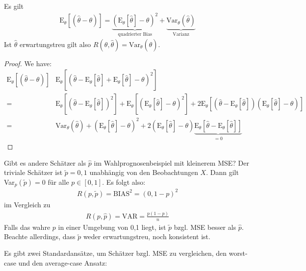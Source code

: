 \documentclass[a4paper]{scrartcl}
\begin{document}
		\begin{theorem}
			Es gilt
			\begin{align*}
				\mathrm{E}_\theta\left[\left(\hat{\theta}-\theta\right)\right]=\underbrace{\left(\mathrm{E}_\theta\left[\hat{\theta}\right]-\theta\right)^2}_{\text{quadrierter Bias}}+\underbrace{\text{Var}_\theta\left(\hat{\theta}\right)}_{\text{Varianz}}
			\end{align*}
			Ist $\hat{\theta}$ erwartungstreu gilt also $R(\theta,\hat{\theta})=\text{Var}_\theta(\hat{\theta})$.
		\end{theorem}
		\begin{proof}
			We have:
			\begin{align*}
				\mathrm{E}_\theta\left[\left(\hat{\theta}-\theta\right)\right]&\mathrm{E}_\theta\left[\left(\hat{\theta}-\mathrm{E}_\theta\left[\hat{\theta}\right]+\mathrm{E}_\theta\left[\hat{\theta}\right]-\theta\right)^2\right]\\
				=&\mathrm{E}_\theta\left[\left(\hat{\theta}-\mathrm{E}_\theta\left[\hat{\theta}\right]\right)^2\right]+\mathrm{E}_\theta\left[\left(\mathrm{E}_\theta\left[\hat{\theta}\right]-\theta\right)^2\right]+2\mathrm{E}_\theta\left[\left(\hat{\theta}-\mathrm{E}_\theta\left[\hat{\theta}\right]\right)\left(\mathrm{E}_\theta\left[\hat{\theta}\right]-\theta\right)\right]\\
				=&\text{Var}_\theta\left(\hat{\theta}\right)+\left(\mathrm{E}_\theta\left[\hat{\theta}\right]-\theta\right)^2+2\left(\mathrm{E}_\theta\left[\hat{\theta}\right]-\theta\right)\underbrace{\mathrm{E}_\theta\left[\hat{\theta}-\mathrm{E}_\theta\left[\hat{\theta}\right]\right]}_{=0}
			\end{align*}
		\end{proof}
		\begin{motivation}
			Gibt es andere Schätzer als $\hat{p}$ im Wahlprognosenbeispiel mit kleinerem MSE? Der triviale Schätzer ist $\tilde{p}=0,1$ unabhängig von den Beobachtungen $X$. Dann gilt Var$_p(\tilde{p})=0$ für alle $p\in[0,1]$. Es folgt also:
			\begin{align*}
				R(p,\tilde{p})=\text{BIAS}^2=(0,1-p)^2
			\end{align*}
			im Vergleich zu
			\begin{align*}
				R(p,\hat{p})=\text{VAR}=\frac{p(1-p)}{n}
			\end{align*}
			Falls das wahre $p$ in einer Umgebung von 0,1 liegt, ist $\tilde{p}$ bzgl. MSE besser als $\hat{p}$. Beachte allerdings, dass $\tilde{p}$ weder erwartungstreu, noch konsistent ist.
			
			Es gibt zwei Standardansätze, um Schätzer bzgl. MSE zu vergleichen, den worst-case und den average-case Ansatz:
		\end{motivation}
\end{document}
